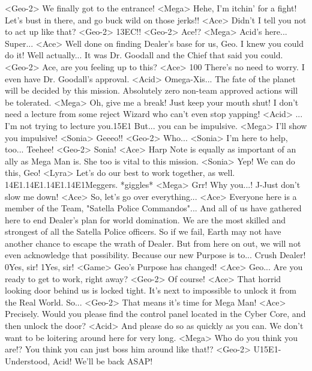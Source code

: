 <Geo-2> We finally got to the entrance! 
<Mega> Hehe, I'm itchin' for a fight! 
Let's bust in there, and go buck wild on those jerks!! 
<Ace> Didn't I tell you not to act up like that? 
<Geo-2> {13}{EC}!! 
<Geo-2> Ace!? 
<Mega> Acid's here... Super... 
<Ace> Well done on finding Dealer's base for us, Geo. 
I knew you could do it! 
Well actually... 
It was Dr. Goodall and the Chief that said you could. 
<Geo-2> Ace, are you feeling up to this? 
<Ace> 100%
There's no need to worry. I even have Dr. Goodall's approval. 
<Acid> Omega-Xis... 
The fate of the planet will be decided by this mission. 
Absolutely zero non-team approved actions will be tolerated. 
<Mega> Oh, give me a break! Just keep your mouth shut! 
I don't need a lecture from some reject Wizard who can't even stop yapping! 
<Acid> ... 
I'm not trying to lecture you.{15}{E1} But... you can be impulsive. 
<Mega> I'll show you impulsive! 
<Sonia> Geeeo!! 
<Geo-2> Who... 
<Sonia> I'm here to help, too... 
Teehee! 
<Geo-2> Sonia! 
<Ace> Harp Note is equally as important of an ally as Mega Man is. 
She too is vital to this mission. 
<Sonia> Yep! 
We can do this, Geo! 
<Lyra> Let's do our best to work together, as well. 
{14}{E1}.{14}{E1}.{14}{E1}.{14}{E1}Meggers. *giggles* 
<Mega> Grr! Why you...! 
J-Just don't slow me down! 
<Ace> So, let's go over everything... 
<Ace> Everyone here is a member of the Team, "Satella Police Commandos"... 
And all of us have gathered here to end Dealer's plan for world domination. 
We are the most skilled and strongest of all the Satella Police officers. 
So if we fail, Earth may not have another chance to escape the wrath of Dealer. 
But from here on out, we will not even acknowledge that possibility. 
Because our new Purpose is to... 
Crush Dealer! 
0Yes, sir! 
1Yes, sir! 
<Game> Geo's Purpose has changed! 
<Ace> Geo... 
Are you ready to get to work, right away? 
<Geo-2> Of course! 
<Ace> That horrid looking door behind us is locked tight. 
It's next to impossible to unlock it from the Real World. 
So... 
<Geo-2> That means it's time for Mega Man! 
<Ace> Precisely. 
Would you please find the control panel located in 
the Cyber Core, and then unlock the door? 
<Acid> And please do so as quickly as you can. 
We don't want to be loitering around here for very long. 
<Mega> Who do you think you are!? You think you can just boss him around like that!? 
<Geo-2> U{15}{E1}-Understood, Acid! 
We'll be back ASAP! 
